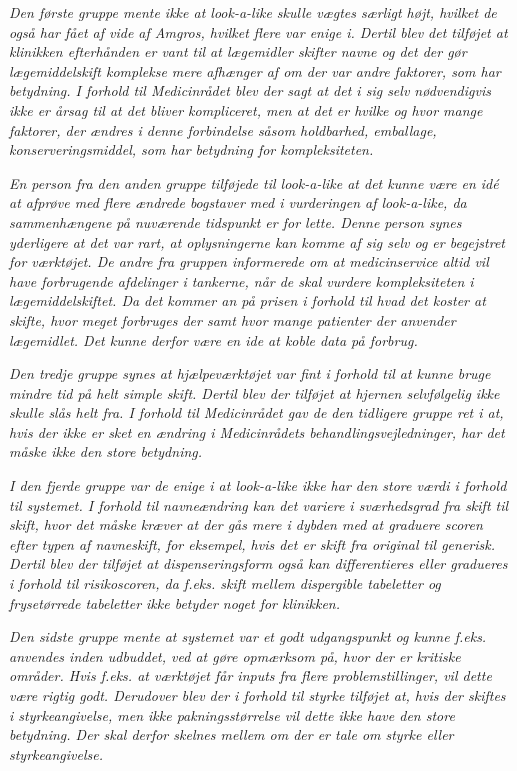 \textit{Den første gruppe mente ikke at look-a-like skulle vægtes særligt højt, hvilket de også har fået af vide af Amgros, hvilket flere var enige i. Dertil blev det tilføjet at klinikken efterhånden er vant til at lægemidler skifter navne og det der gør lægemiddelskift komplekse mere afhænger af om der var andre faktorer, som har betydning. I forhold til Medicinrådet blev der sagt at det i sig selv nødvendigvis ikke er årsag til at det bliver kompliceret, men at det er hvilke og hvor mange faktorer, der ændres i denne forbindelse såsom holdbarhed, emballage, konserveringsmiddel, som har betydning for kompleksiteten.}

\textit{En person fra den anden gruppe tilføjede til look-a-like at det kunne være en idé at afprøve med flere ændrede bogstaver med i vurderingen af look-a-like, da sammenhængene  på nuværende tidspunkt er for lette. Denne person synes yderligere at det var rart, at oplysningerne kan komme af sig selv og er begejstret for værktøjet. De andre fra gruppen informerede om at medicinservice altid vil have forbrugende afdelinger i tankerne, når de skal vurdere kompleksiteten i lægemiddelskiftet. Da det kommer an på prisen i forhold til hvad det koster at skifte, hvor meget forbruges der samt hvor mange patienter der anvender lægemidlet. Det kunne derfor være en ide at koble data på forbrug.}

\textit{Den tredje gruppe synes at hjælpeværktøjet var fint i forhold til at kunne bruge mindre tid på helt simple skift. Dertil blev der tilføjet at hjernen selvfølgelig ikke skulle slås helt fra. I forhold til Medicinrådet gav de den tidligere gruppe ret i at, hvis der ikke er sket en ændring i Medicinrådets behandlingsvejledninger, har det måske ikke den store betydning. }

\textit{I den fjerde gruppe var de enige i at look-a-like ikke har den store værdi i forhold til systemet. I forhold til navneændring kan det variere i sværhedsgrad fra skift til skift, hvor det måske kræver at der gås mere i dybden med at graduere scoren efter typen af navneskift, for eksempel, hvis det er skift fra original til generisk. Dertil blev der tilføjet at dispenseringsform også kan differentieres eller gradueres i forhold til risikoscoren, da f.eks. skift mellem dispergible tabeletter og frysetørrede tabeletter ikke betyder noget for klinikken. }

\textit{
Den sidste gruppe mente at systemet var et godt udgangspunkt og kunne f.eks. anvendes inden udbuddet, ved at gøre opmærksom på, hvor der er kritiske områder. Hvis f.eks. at værktøjet får inputs fra flere problemstillinger, vil dette være rigtig godt. Derudover blev der i forhold til styrke tilføjet at, hvis der skiftes i styrkeangivelse, men ikke pakningsstørrelse vil dette ikke have den store betydning. Der skal derfor skelnes mellem om der er tale om styrke eller styrkeangivelse.}
